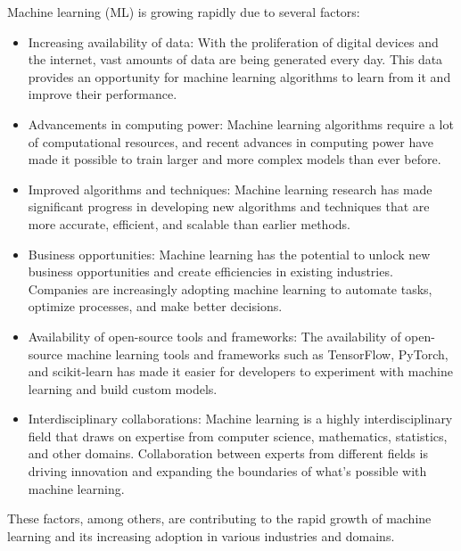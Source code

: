 \documentclass{article}
\begin{document}
\noindent Machine learning (ML) is growing rapidly due to several factors:
\begin{itemize}
    \item Increasing availability of data: With the proliferation of digital devices and the internet, vast amounts of data are being generated every day. This data provides an opportunity for machine learning algorithms to learn from it and improve their performance.
    \item Advancements in computing power: Machine learning algorithms require a lot of computational resources, and recent advances in computing power have made it possible to train larger and more complex models than ever before.
    \item Improved algorithms and techniques: Machine learning research has made significant progress in developing new algorithms and techniques that are more accurate, efficient, and scalable than earlier methods.
    \item Business opportunities: Machine learning has the potential to unlock new business opportunities and create efficiencies in existing industries. Companies are increasingly adopting machine learning to automate tasks, optimize processes, and make better decisions.
    \item Availability of open-source tools and frameworks: The availability of open-source machine learning tools and frameworks such as TensorFlow, PyTorch, and scikit-learn has made it easier for developers to experiment with machine learning and build custom models.
    \item Interdisciplinary collaborations: Machine learning is a highly interdisciplinary field that draws on expertise from computer science, mathematics, statistics, and other domains. Collaboration between experts from different fields is driving innovation and expanding the boundaries of what's possible with machine learning.
\end{itemize}
These factors, among others, are contributing to the rapid growth of machine learning and its increasing adoption in various industries and domains.
\end{document}
